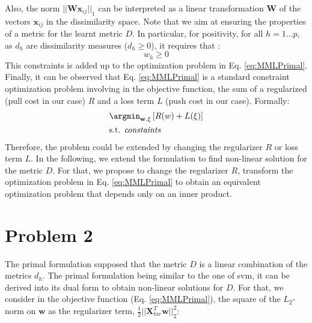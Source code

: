 \noindent Also, the norm $||\textbf{W}\textbf{x}_{ij}||_1$ can be interpreted as a linear transformation $\textbf{W}$ of the vectors $\textbf{x}_{ij}$ in the dissimilarity space. Note that we aim at ensuring the properties of a metric for the learnt metric $D$. In particular, for positivity, for all $h=1...p$, as $d_h$ are dissimilarity measures ($d_h \geq 0$), it requires that :
\begin{equation}
	w_h \geq 0
\end{equation}
This constraints is added up to the optimization problem in Eq. \ref{eq:MMLPrimal}. Finally, it can be observed that Eq. \ref{eq:MMLPrimal} is a standard constraint optimization problem involving in the objective function, the sum of a regularized (pull cost in our case) $R$ and a loss term $L$ (push cost in our case). Formally:
\begin{equation}
\begin{aligned}
	&\displaystyle 		\argmin_{\textbf{w},\xi} \left[  R(w) + L(\xi) \right] \\
	&\text{s.t. \textit{constaints} }
\end{aligned}
\end{equation}
Therefore, the problem could be extended by changing the regularizer $R$ or loss term $L$. In the following, we extend the formulation to find non-linear solution for the metric $D$. For that, we propose to change the regularizer $R$, transform the optimization problem in Eq. \ref{eq:MMLPrimal} to obtain an equivalent optimization problem that depends only on an inner product.


\section{Problem 2}
The primal formulation supposed that the metric $D$ is a linear combination of the metrics $d_h$. The primal formulation being similar to the one of {\sc svm}, it can be derived into its dual form to obtain non-linear solutions for $D$.
For that, we consider in the objective function (Eq. \ref{eq:MMLPrimal}), the square of the $L_2$-norm on $\textbf{w}$ as the regularizer term, $\frac{1}{2}||\textbf{X}_{tar}^T \textbf{w}||_2^2$:

